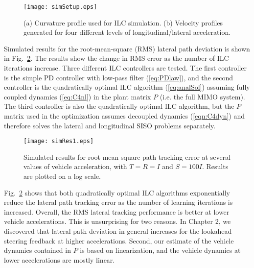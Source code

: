 \begin{figure}[bh]
\centering
\texttt{[image: simSetup.eps]}
\caption[Curvature profile used for ILC simulation.]{ (a) Curvature profile used for ILC simulation. (b) Velocity profiles generated for four different levels of longitudinal/lateral acceleration. }
\label{fig:simSetup}
\end{figure}

Simulated results for the root-mean-square (RMS) lateral path deviation is shown in Fig.~\ref{fig:simRes1}. The results
show the change in RMS error as the number of ILC iterations increase. Three different ILC controllers are tested. 
The first controller is the simple PD controller
with low-pass filter (\ref{eq:PDlaw}), and the second controller is the quadratically optimal ILC algorithm (\ref{eq:analSol}) assuming fully coupled dynamics (\ref{eq:C4nl}) in the plant
matrix $P$ (i.e. the full MIMO system).
The third controller is also the quadratically optimal ILC algorithm, but the $P$ matrix used in the optimization
assumes decoupled dynamics (\ref{eqn:C4dyn}) and therefore solves the lateral and longitudinal SISO problems separately. 

\begin{figure}[h!]
\centering
\texttt{[image: simRes1.eps]}
\caption[Simulated results for root-mean-square path tracking error at several values of vehicle acceleration]{Simulated results for root-mean-square path tracking error at several values of vehicle acceleration, with $T = R = I$ and $S = \mathrm{100} I$.
Results are plotted on a log scale.}
\label{fig:simRes1}
\end{figure}

Fig.~\ref{fig:simRes1} shows that both quadratically optimal ILC algorithms exponentially reduce the lateral
path tracking error as the number of learning iterations is increased. Overall, the RMS lateral tracking performance is
better at lower vehicle accelerations. This is unsurprising for two reasons. In Chapter 2, we discovered that lateral path deviation in 
general increases for the lookahead steering feedback at higher accelerations. Second, our estimate of the vehicle dynamics contained in $P$
is based on linearization, and the vehicle dynamics at lower accelerations are mostly linear.

